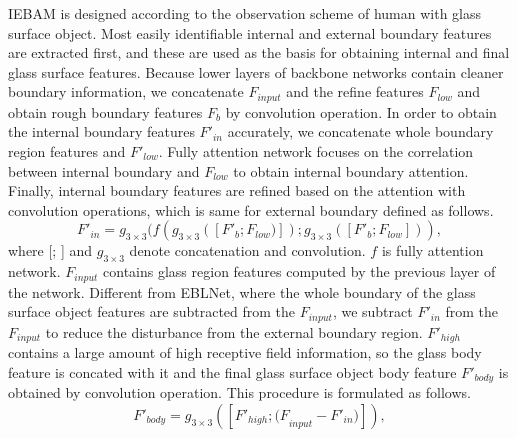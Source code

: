 \documentclass[10pt,twocolumn,letterpaper]{article}
\begin{document}
IEBAM is designed according to the observation scheme of human with glass surface object. Most easily identifiable internal and external boundary features are extracted first, and these are used as the basis for obtaining  internal and final glass surface features. Because lower layers of backbone networks contain cleaner boundary information, we concatenate ${\textit{F}}_{input}$ and the refine features ${\textit{F}}_{low}$ and obtain rough boundary features ${\textit{F}}_{b}$ by convolution operation. In order to obtain the internal boundary features ${\textit{F}}{'}_{in}$ accurately, we concatenate whole boundary region features and ${\textit{F}}{'}_{low}$. Fully attention network focuses on the correlation between internal boundary and ${\textit{F}}_{low}$ to obtain internal boundary attention. Finally, internal boundary features are refined based on the attention with convolution operations, which is same for external boundary defined as follows.
\begin{equation}
\label{eqn:01}
{\textit{F}}{'}_{in}={\textit{g}}_{3\times{3}}({\textit{f}}({\textit{g}}_{3\times{3}}([{\textit{F}}{'}_{b};{\textit{F}}_{low})]);{\textit{g}}_{3\times{3}}([{\textit{F}}{'}_{b};{\textit{F}}_{low}])),
\end{equation}
where [; ] and ${\textit{g}}_{3\times{3}}$ denote concatenation and convolution. ${\textit{f}}$ is fully attention network. ${\textit{F}}_{input}$ contains glass region features computed by the previous layer of the network. Different from EBLNet, where the whole boundary of the glass surface object features are subtracted from the ${\textit{F}}_{input}$, we subtract ${\textit{F}}{'}_{in}$ from the ${\textit{F}}_{input}$ to reduce the disturbance from the external boundary region. 
${\textit{F}}{'}_{high}$ contains a large amount of high receptive field information, so the glass body feature is concated with it and the final glass surface object body feature ${\textit{F}}{'}_{body}$ is obtained by convolution operation. This procedure is formulated as follows.
\begin{equation}
\label{eqn:02}
{\textit{F}}{'}_{body}={\textit{g}}_{3\times{3}}([{\textit{F}}{'}_{high};{(\textit{F}}_{input}-{\textit{F}}{'}_{in})]),
\end{equation}
\end{document}
